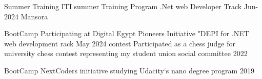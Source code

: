 


\begin{cvhonors}

  \cvhonor
    {Summer Training} %
    {ITI summer Training Program .Net web Developer Track} %
    {Jun-2024 } %
    {Mansora} %
    
    \cvhonor
    {BootCamp} %
    {Participating at Digital Egypt Pioneers Initiative "DEPI for .NET web development rack} %
    {May 2024} %
    {} %
  \cvhonor
    { contest} %
    {Participated as a chess judge for university chess contest representing  my student union social committee} %
    {2022} %
    {} %
     
  \cvhonor
    {BootCamp} %
    {NextCoders initiative studying Udacity`s nano degree program} %
    {2019} %
    {} %

\end{cvhonors}